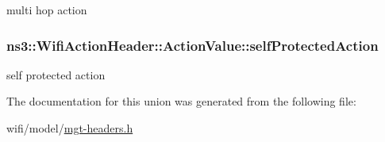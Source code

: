 multi hop action 

\subsubsection[{\texorpdfstring{self\+Protected\+Action}{selfProtectedAction}}]{ ns3\+::\+Wifi\+Action\+Header\+::\+Action\+Value\+::self\+Protected\+Action}\hypertarget{unionns3_1_1WifiActionHeader_1_1ActionValue_a5ed6e759e6f6c4a6d1494f852a12231d}{}\label{unionns3_1_1WifiActionHeader_1_1ActionValue_a5ed6e759e6f6c4a6d1494f852a12231d}


self protected action 



The documentation for this union was generated from the following file\+:\begin{DoxyCompactItemize}
\item 
wifi/model/\hyperlink{mgt-headers_8h}{mgt-\/headers.\+h}\end{DoxyCompactItemize}

